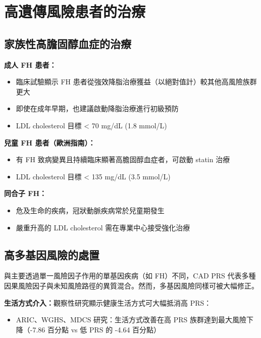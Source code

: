 \documentclass[12pt,a4paper]{article}
\begin{document}
\section{高遺傳風險患者的治療}

\subsection{家族性高膽固醇血症的治療}

\begin{tcolorbox}[
    colback=emergency_blue!5!white,
    colframe=emergency_blue,
    title=\textbf{FH 治療指引重點},
    fonttitle=\bfseries
]
\textbf{成人 FH 患者：}
\begin{itemize}
    \item 臨床試驗顯示 FH 患者從強效降脂治療獲益（以絕對值計）較其他高風險族群更大
    \item 即使在成年早期，也建議啟動降脂治療進行初級預防
    \item LDL cholesterol 目標 < 70 mg/dL (1.8 mmol/L)
\end{itemize}

\textbf{兒童 FH 患者（歐洲指南）：}
\begin{itemize}
    \item 有 FH 致病變異且持續臨床顯著高膽固醇血症者，可啟動 statin 治療
    \item LDL cholesterol 目標 < 135 mg/dL (3.5 mmol/L)
\end{itemize}

\textbf{同合子 FH：}
\begin{itemize}
    \item 危及生命的疾病，冠狀動脈疾病常於兒童期發生
    \item 嚴重升高的 LDL cholesterol 需在專業中心接受強化治療
\end{itemize}
\end{tcolorbox}

\subsection{高多基因風險的處置}

與主要透過單一風險因子作用的單基因疾病（如 FH）不同，CAD PRS 代表多種因果風險因子與未知風險路徑的異質混合。然而，多基因風險同樣可被大幅修正。

\textbf{生活方式介入：}觀察性研究顯示健康生活方式可大幅抵消高 PRS：
\begin{itemize}
    \item ARIC、WGHS、MDCS 研究：生活方式改善在高 PRS 族群達到最大風險下降（-7.86 百分點 vs 低 PRS 的 -4.64 百分點）
\end{itemize}
\end{document}
